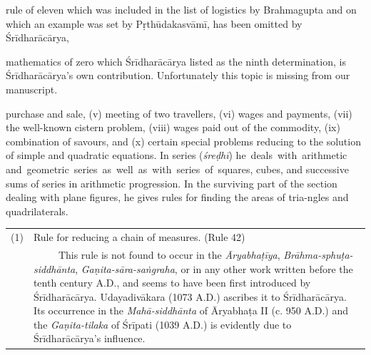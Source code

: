 \documentclass[10pt, openany]{book}
\begin{document}
{
{rule of eleven which was included in the list of logistics by}
{Brahmagupta and on which an example was set by Pṛthūdakasvāmī, has been omitted by Śrīdharācārya,}

\newpage

\englishfont{}
{mathematics of zero which Śrīdharācārya listed as the ninth}
{determination, is Śrīdharācārya's own contribution. Unfortunately this topic is missing from our manuscript.}

{purchase and sale, (v) meeting of two travellers, (vi) wages}
{and payments, (vii) the well-known cistern problem, (viii)}
{wages paid out of the commodity, (ix) combination of savours,}
{and (x) certain special problems reducing to the solution of}
{simple and quadratic equations. In series (\textit{śreḍhī}) he \,deals \,with \,arithmetic \,and \,geometric \,series \,as \,well \,as \,with \,series \,of \,squares, cubes, and successive sums of series in arithmetic}
{progression. In the surviving part of the section dealing with}
{plane figures, he gives rules for finding the areas of tria-ngles}
{and quadrilaterals.}


\vspace{0.3cm}
\hspace{-8mm} \begin{tabular}{p{} p{}}
(1) & Rule for reducing a chain of measures. (Rule 42)\\
& ~~~~~This rule is not found to occur in the \textit{Āryabhaṭīya}, {\textit{Brāhma-sphuṭa-siddhānta}, \textit{Gaṇita-sāra-saṅgraha}, or in any}
{other work written before the tenth century A.D., and}
{seems to have been first introduced by Śrīdharācārya.}
{Udayadivākara (1073 A.D.) ascribes it to Śrīdharācārya.}
{Its occurrence in the \textit{Mahā-siddhānta} of Āryabhaṭa II}
{(c. 950 A.D.) and the \textit{Gaṇita-tilaka} of Śrīpati (1039 A.D.)}
{is evidently due to Śrīdharācārya's influence.}
\end{tabular}

}
\end{document}

